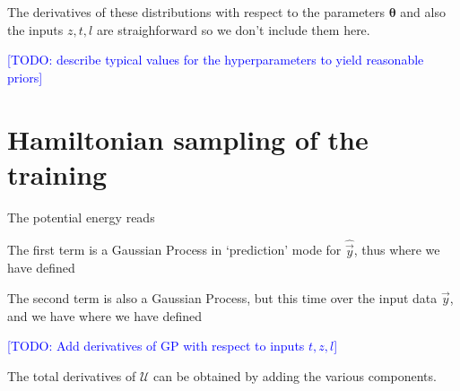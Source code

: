 \documentclass[aps,prd,showpacs,superscriptaddress,groupedaddress]{revtex4}  %
\newcommand{\todo}[1]{\textcolor{blue}{[TODO: #1]}}
\begin{document}
The derivatives of these distributions with respect to the parameters $\bm{\theta}$ and also the inputs $z,t,l$ are straighforward so we don't include them here.

\todo{describe typical values for the hyperparameters to yield reasonable priors}



\section{Hamiltonian sampling of the training}

The potential energy reads
	
The first term is a Gaussian Process in `prediction' mode for $\hat{\vec{y}}$, thus
where we have defined

The second term is also a Gaussian Process, but this time over the input data $\vec{y}$, and we have
where we have defined



\todo{Add derivatives of GP with respect to inputs $t,z,l$}

The total derivatives of $\mathcal{U}$ can be obtained by adding the various components.
\end{document}

